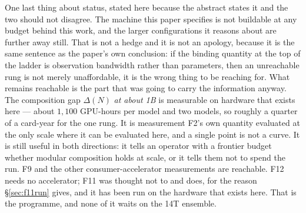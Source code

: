\documentclass[11pt]{article}
\begin{document}
One last thing about status, stated here because the abstract states it and the two should not disagree. The machine this paper specifies is not buildable at any budget behind this work, and the larger configurations it reasons about are further away still. That is not a hedge and it is not an apology, because it is the same sentence as the paper's own conclusion: if the binding quantity at the top of the ladder is observation bandwidth rather than parameters, then an unreachable rung is not merely unaffordable, it is the wrong thing to be reaching for. What remains reachable is the part that was going to carry the information anyway. The composition gap $\Delta(N)$ \emph{at about 1B} is measurable on hardware that exists here --- about $1{,}100$ GPU-hours per model and two models, so roughly a quarter of a card-year for the one rung. It is measurement F2's own quantity evaluated at the only scale where it can be evaluated here, and a single point is not a curve. It is still useful in both directions: it tells an operator with a frontier budget whether modular composition holds at scale, or it tells them not to spend the run. F9 and the other consumer-accelerator measurements are reachable. F12 needs no accelerator; F11 was thought not to and does, for the reason \S\ref{sec:f11run} gives, and it has been run on the hardware that exists here. That is the programme, and none of it waits on the 14T ensemble.
\end{document}
